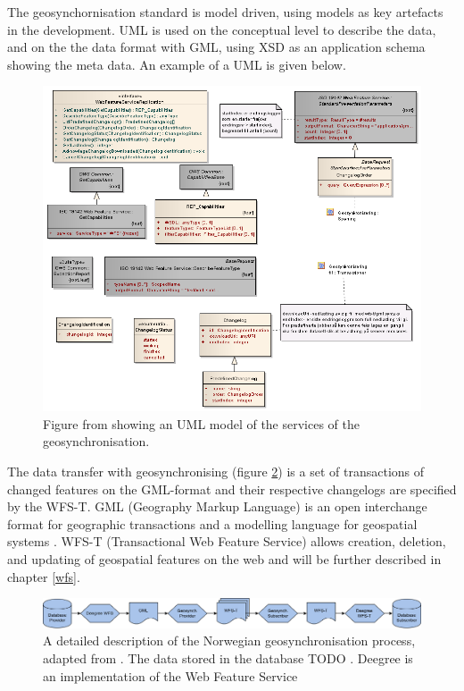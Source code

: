 The geosynchornisation standard is model driven, using models as key artefacts in the development.
UML is used on the conceptual level to describe the data, and on the the data format with GML, using XSD as an application schema showing the meta data. An example of a UML is given below.

\begin{figure}[H]
	\centering
	\includegraphics[scale=0.35]{img/uml.png}
	\caption{Figure from \cite{Kartverket2012a} showing an UML model of the services of the geosynchronisation.}
	\label{fig:uml}
\end{figure}

The data transfer with geosynchronising (figure \ref{fig:geosyncprocess}) is a set of transactions of changed features on the GML-format and their respective changelogs are specified by the WFS-T.  GML (Geography Markup Language) is an open interchange format for geographic transactions and a modelling language for geospatial systems \citep{OGC2017}. WFS-T (Transactional Web Feature Service) allows creation, deletion, and updating of geospatial features on the web \citep{OGCNetwork} and will be further described in chapter \ref{wfs}. 

\begin{figure}[H]
	\centering
	\includegraphics[scale=0.43]{img/geosynkkk.png}
	\caption{A detailed description of the Norwegian geosynchronisation process, adapted from \cite{Eggan2017}. The data stored in the database TODO . Deegree is an implementation of the Web Feature Service}
	\label{fig:geosyncprocess}
\end{figure}



